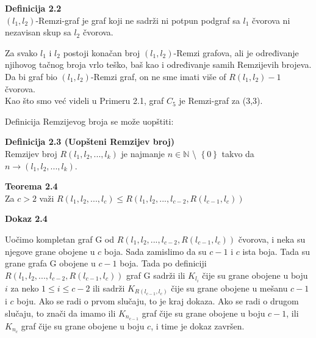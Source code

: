 \documentclass[12pt,a4paper]{article}
\begin{document}
	\begin{mdframed}
	{\noindent\fontsize{12pt}{12pt}\textbf{Definicija 2.2}}\\
	$(l_1, l_2)$-Remzi-graf je graf koji ne sadrži ni potpun podgraf sa $l_1$ čvorova ni nezavisan skup sa $l_2$ čvorova.
	
	\end{mdframed}
	
	Za svako $l_1$ i $l_2$ postoji konačan broj $(l_1, l_2)$-Remzi grafova, ali je određivanje njihovog tačnog broja vrlo teško, baš kao i određivanje samih Remzijevih brojeva. Da bi graf bio $(l_1, l_2)$-Remzi graf, on ne sme imati više of $R(l_1, l_2)-1$ čvorova.\\
	Kao što smo već videli u Primeru 2.1, graf $C_5$ je Remzi-graf za (3,3).
	
	\newpage
	

	\noindent Definicija Remzijevog broja se može uopštiti: 	
	
	\begin{mdframed}
	\vspace{0.4em}
	
	{\fontsize{12pt}{12pt}\textbf{Definicija 2.3 (Uopšteni Remzijev broj)}}
	\\
	
	\vspace{-0.8em}
	Remzijev broj $R(l_{1}, l_{2}, ... , l_{k})$ je najmanje $n \in \mathbb{N}$ \textbackslash {} $\left\lbrace 0\right\rbrace $ takvo da $n\rightarrow(l_{1}, l_{2},  ... , l_{k})$.
	\end{mdframed}
	
	{\noindent\fontsize{12pt}{12pt}\textbf{Teorema 2.4}}
	\vspace{0.4em}
	\\
	Za $c>2$ važi $R(l_1, l_2, ... , l_c) \leq R(l_1, l_2, ... , l_{c-2}, R(l_{c-1}, l_c))$
	
	\vspace{0.3em}
	
	{\noindent\fontsize{12pt}{12pt}\textbf{Dokaz 2.4}}
	\vspace{0.4em}
	
	\noindent Uočimo kompletan graf G od $R(l_1, l_2, ... , l_{c-2}, R(l_{c-1}, l_c))$ čvorova, i neka su njegove grane obojene u $c$ boja. Sada zamislimo da su $c-1$ i $c$ ista boja. Tada su grane grafa G obojene u $c-1$ boja. Tada po definiciji  $R(l_1, l_2, ... , l_{c-2}, R(l_{c-1}, l_c))$ graf G sadrži ili $K_{l_i}$ čije su grane obojene u boju $i$ za neko $1 \leq i \leq c-2$ ili sadrži $K_{R(l_{c-1}, l_c)}$ čije su grane obojene u mešanu $c-1$ i $c$ boju. Ako se radi o prvom slučaju, to je kraj dokaza. Ako se radi o drugom slučaju, to znači da imamo ili $K_{n_{c-1}}$ graf čije su grane obojene u boju $c-1$, ili $K_{n_{c}}$ graf čije su grane obojene u boju $c$, i time je dokaz završen.
	
\end{document}
